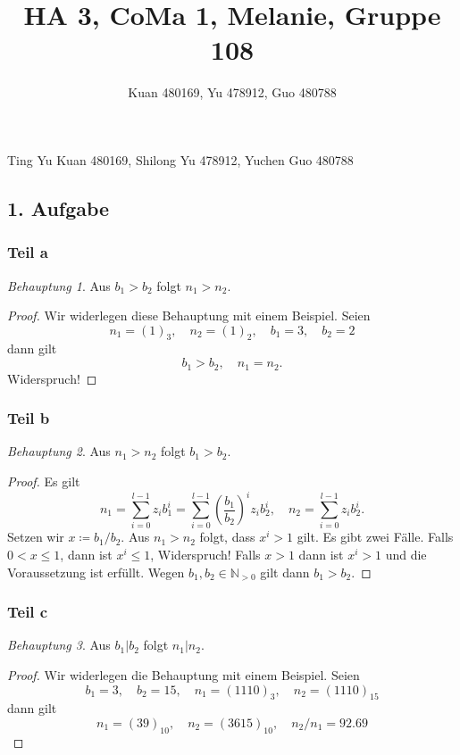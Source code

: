 \documentclass[a5paper]{article}
\title{HA 3, CoMa 1, Melanie, Gruppe 108}
\author{Kuan 480169, Yu 478912, Guo 480788}
\theoremstyle{remark}
\newtheorem*{Behauptung}{Behauptung}
\begin{document}
\maketitle
\begin{center}
Ting Yu Kuan 480169, Shilong Yu 478912, Yuchen Guo 480788
\end{center}
\subsection{1. Aufgabe}
\subsubsection{Teil a}
\begin{Behauptung}
  Aus \(b_1 > b_2\) folgt \(n_1 > n_2\).
\end{Behauptung}
\begin{proof}
  Wir widerlegen diese Behauptung mit einem Beispiel.  Seien
  \[
    n_{1} = (1)_{3}, \quad n_{2} = (1)_{2}, \quad b_{1} = 3, \quad b_{2} = 2
  \]
  dann gilt
  \[
    b_{1} > b_{2}, \quad n_{1} = n_{2}.
  \]
  Widerspruch!
\end{proof}
\subsubsection{Teil b}
\begin{Behauptung}
  Aus \(n_1 > n_2\) folgt \(b_1 > b_2\).
\end{Behauptung}
\begin{proof}
  Es gilt
  \[n_1=\sum_{i=0}^{l-1}{z_ib_1^i}=\sum_{i=0}^{l-1}{ \left(
        \frac{b_1}{b_2} \right)^iz_i b_2^i}, \quad n_2=\sum_{i=0}^{l-1}{z_ib_2^i}.\]
  Setzen wir \(x \coloneq b_{1}/b_{2}\).
  Aus \(n_1>n_2\) folgt, dass
  \(x^i > 1\) gilt.
  Es gibt zwei Fälle.   Falls \(0 < x \le 1\), dann ist \(x^{i} \le 1\),
  Widerspruch!  Falls \(x > 1\) dann ist \(x^{i} > 1\) und die
  Voraussetzung ist erfüllt.  Wegen \(b_1, b_2 \in \mathbb{N}_{>0}\)
  gilt dann \(b_1>b_2\).
\end{proof}
\subsubsection{Teil c}
\begin{Behauptung}
  Aus \(b_1|b_2\) folgt \(n_1|n_2\).
\end{Behauptung}
\begin{proof}
  Wir widerlegen die Behauptung mit einem Beispiel.  Seien
  \[b_{1} = 3, \quad b_{2} = 15, \quad n_{1} = (1110)_{3}, \quad n_{2} =
    (1110)_{15}\]
  dann gilt
  \[n_{1} = (39)_{10}, \quad n_{2} = (3615)_{10}, \quad n_{2}/n_{1} = 92.69\]
\end{proof}
\end{document}
